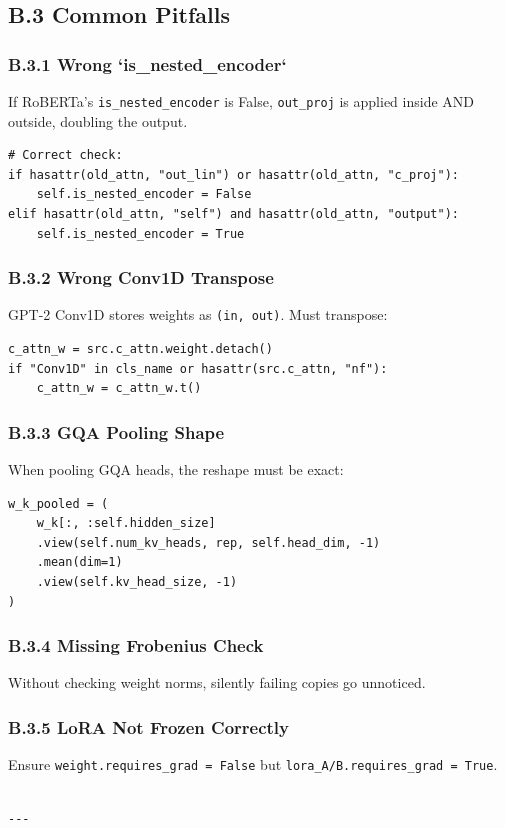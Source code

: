 \subsection{B.3 Common Pitfalls}

\subsubsection{B.3.1 Wrong `is\_nested\_encoder`}

If RoBERTa's \texttt{is\_nested\_encoder} is False, \texttt{out\_proj} is applied inside 
AND outside, doubling the output.

\begin{lstlisting}
# Correct check:
if hasattr(old_attn, "out_lin") or hasattr(old_attn, "c_proj"):
    self.is_nested_encoder = False
elif hasattr(old_attn, "self") and hasattr(old_attn, "output"):
    self.is_nested_encoder = True
\end{lstlisting}

\subsubsection{B.3.2 Wrong Conv1D Transpose}

GPT-2 Conv1D stores weights as \texttt{(in, out)}. Must transpose:

\begin{lstlisting}
c_attn_w = src.c_attn.weight.detach()
if "Conv1D" in cls_name or hasattr(src.c_attn, "nf"):
    c_attn_w = c_attn_w.t()
\end{lstlisting}

\subsubsection{B.3.3 GQA Pooling Shape}

When pooling GQA heads, the reshape must be exact:

\begin{lstlisting}
w_k_pooled = (
    w_k[:, :self.hidden_size]
    .view(self.num_kv_heads, rep, self.head_dim, -1)
    .mean(dim=1)
    .view(self.kv_head_size, -1)
)
\end{lstlisting}

\subsubsection{B.3.4 Missing Frobenius Check}

Without checking weight norms, silently failing copies go unnoticed.

\subsubsection{B.3.5 LoRA Not Frozen Correctly}

Ensure \texttt{weight.requires\_grad = False} but \texttt{lora\_A/B.requires\_grad = True}.
\begin{lstlisting}

---
\end{lstlisting}